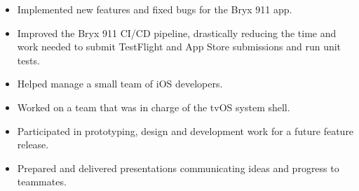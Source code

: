 \documentclass[10pt,letter,ragged2e]{altacv}
\begin{document}


\begin{fullwidth}
\makecvheader
\end{fullwidth}




\begin{itemize}
  \item Implemented new features and fixed bugs for the Bryx 911 app.
  \item Improved the Bryx 911 CI/CD pipeline, drastically reducing the time and work needed to submit TestFlight and App Store submissions and run unit tests.
  \item Helped manage a small team of iOS developers.
\end{itemize}

\divider

\begin{itemize}
  \item Worked on a team that was in charge of the tvOS system shell.
  \item Participated in prototyping, design and development work for a future feature release.
  \item Prepared and delivered presentations communicating ideas and progress to teammates.
\end{itemize}

\divider
\end{document}
